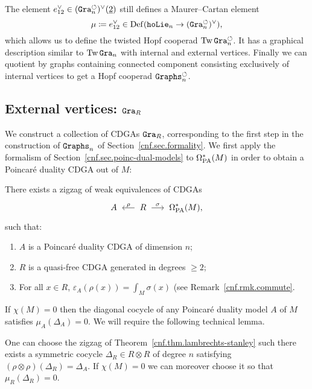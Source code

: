 The element $e_{12}^{\vee} \in (\mathtt{Gra}^{\circlearrowleft}_{n})^{\vee}(\underline{2})$ still defines a Maurer--Cartan element
\[ \mu \coloneqq e_{12}^{\vee} \in \operatorname{Def}(\mathtt{hoLie}_{n} \to (\mathtt{Gra}^{\circlearrowleft}_{n})^{\vee}), \]
which allows us to define the twisted Hopf cooperad $\operatorname{Tw} \mathtt{Gra}^{\circlearrowleft}_{n}$.
It has a graphical description similar to $\operatorname{Tw}\mathtt{Gra}_{n}$ with internal and external vertices.
Finally we can quotient by graphs containing connected component consisting exclusively of internal vertices to get a Hopf cooperad $\mathtt{Graphs}^{\circlearrowleft}_{n}$.

\subsection{External vertices: \texorpdfstring{$\mathtt{Gra}_{R}$}{Gra\_R}}
\label{cnf.sec.external-vertices}

We construct a collection of CDGAs $\mathtt{Gra}_{R}$, corresponding to the first step in the construction of $\mathtt{Graphs}_{n}$ of Section~\ref{cnf.sec.formality}.
We first apply the formalism of Section~\ref{cnf.sec.poinc-dual-models} to $\Omega_{\mathrm{PA}}^{*}(M)$ in order to obtain a Poincaré duality CDGA out of $M$:

\begin{theorem}
  \label{cnf.thm.lambrechts-stanley}
  There exists a zigzag of weak equivalences of CDGAs
  \[ A \tkleftarrow{\rho} R \tkrightarrow{\sigma} \OmPA^{*}(M), \]
  such that:
  \begin{enumerate}
  \item $A$ is a Poincaré duality CDGA of dimension $n$;
  \item $R$ is a quasi-free CDGA generated in degrees $\geq 2$;
  \item For all $x \in R$, $\varepsilon_{A}(\rho(x)) = \int_{M} \sigma(x)$ (see Remark~\ref{cnf.rmk.commute}.
  \end{enumerate}
\end{theorem}

If $\chi(M) = 0$ then the diagonal cocycle of any Poincaré duality model $A$ of $M$ satisfies $\mu_{A}(\Delta_{A}) = 0$.
We will require the following technical lemma.

\begin{proposition}
  \label{cnf.lemma.zigzag-a-r-omega}
  One can choose the zigzag of Theorem~\ref{cnf.thm.lambrechts-stanley} such there exists a symmetric cocycle $\Delta_{R} \in R \otimes R$ of degree $n$ satisfying $(\rho \otimes \rho)(\Delta_{R}) = \Delta_{A}$.
  If $\chi(M) = 0$ we can moreover choose it so that $\mu_{R}(\Delta_{R}) = 0$.
\end{proposition}

